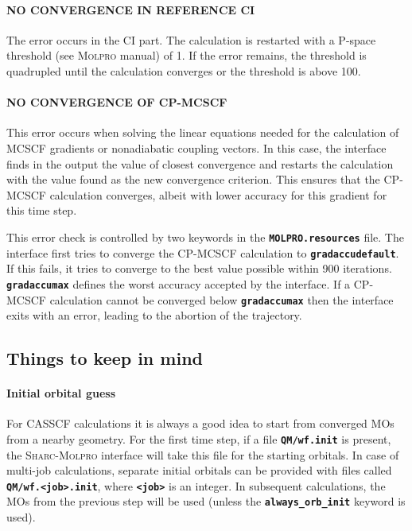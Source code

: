 \documentclass[a4paper,10pt,DIV=15,openany]{scrbook}
\newcommand{\sharc}{\textsc{Sharc}}
\newcommand{\ttt}[1]{\textbf{\texttt{#1}}}
\begin{document}
\paragraph{NO CONVERGENCE IN REFERENCE CI} The error occurs in the CI part. The calculation is restarted with a P-space threshold (see \textsc{Molpro} manual) of 1. If the error remains, the threshold is quadrupled until the calculation converges or the threshold is above 100.

\paragraph{NO CONVERGENCE OF CP-MCSCF} This error occurs when solving the linear equations needed for the calculation of MCSCF gradients or nonadiabatic coupling vectors. In this case, the interface finds in the output the value of closest convergence and restarts the calculation with the value found as the new convergence criterion. This ensures that the CP-MCSCF calculation converges, albeit with lower accuracy for this gradient for this time step.

This error check is controlled by two keywords in the \ttt{MOLPRO.resources} file. The interface first tries to converge the CP-MCSCF calculation to \ttt{gradaccudefault}. If this fails, it tries to converge to the best value possible within 900 iterations. \ttt{gradaccumax} defines the worst accuracy accepted by the interface. If a CP-MCSCF calculation cannot be converged below \ttt{gradaccumax} then the interface exits with an error, leading to the abortion of the trajectory.

\subsection{Things to keep in mind}

\paragraph{Initial orbital guess}

For CASSCF calculations it is always a good idea to start from converged MOs from a nearby geometry. For the first time step, if a file \ttt{QM/wf.init} is present, the \sharc-\textsc{Molpro} interface will take this file for the starting orbitals. In case of multi-job calculations, separate initial orbitals can be provided with files called \ttt{QM/wf.<job>.init}, where \ttt{<job>} is an integer.
In subsequent calculations, the MOs from the previous step will be used (unless the \ttt{always\_orb\_init} keyword is used).
\end{document}

